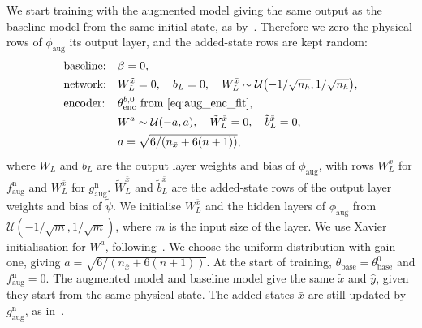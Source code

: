 We start training with the augmented model giving the same
output as the baseline model from the same initial state, as 
by~\cite[Eq.~(29)]{hoekstra2026lfr}. 
Therefore we zero the physical rows of $\phi_{\mathrm{aug}}$ its output layer, 
and the added-state rows are kept random:
\begin{equation}
\begin{aligned}
 &\text{baseline:} &&\beta=0,\\
 &\text{network:}  &&W^{\tilde x}_L=0,\quad b_L=0,\quad W^{\bar x}_L\sim\mathcal U\bigl(-1/\sqrt{n_h},1/\sqrt{n_h}\bigr),\\
 &\text{encoder:}  &&\theta^{b,0}_{\mathrm{enc}}\text{ from \eqref{eq:aug_enc_fit}},\\
 &                 &&W^a\sim\mathcal U(-a,a),\quad \tilde W^{\bar x}_L=0,\quad \tilde b^{\bar x}_L=0,\\
 &                 &&a=\sqrt{6/(n_{\bar x}+6(n+1))},
\end{aligned}
 \label{eq:aug_init}
\end{equation}
where $W_L$ and $b_L$ are the output layer weights and bias of
$\phi_{\mathrm{aug}}$, with rows $W^{\tilde x}_L$ for
$f^{\mathrm n}_{\mathrm{aug}}$ and $W^{\bar x}_L$ for
$g^{\mathrm n}_{\mathrm{aug}}$.
$\tilde W^{\bar x}_L$ and $\tilde b^{\bar x}_L$
are the added-state rows of the output layer weights and bias of $\tilde\psi$.
We initialise $W^{\bar x}_L$ and the hidden layers of $\phi_{\mathrm{aug}}$
from $\mathcal U(-1/\sqrt{m},1/\sqrt{m})$,
where $m$ is the input size of the layer.
We use Xavier initialisation for $W^a$,
following~\cite[Eq.~(31)]{hoekstra2026lfr}.
We choose the uniform distribution with gain one,
giving $a=\sqrt{6/(n_{\bar x}+6(n+1))}$.
At the start of training, $\theta_{\mathrm{base}}=\theta^0_{\mathrm{base}}$
and $f^{\mathrm n}_{\mathrm{aug}}=0$.
The augmented model and baseline model give the same $\tilde x$ and $\hat y$, 
given they start from the same physical state.
The added states $\bar x$ are still updated by
$g^{\mathrm n}_{\mathrm{aug}}$, as in~\cite[Eq.~(29)]{hoekstra2026lfr}.
\\

